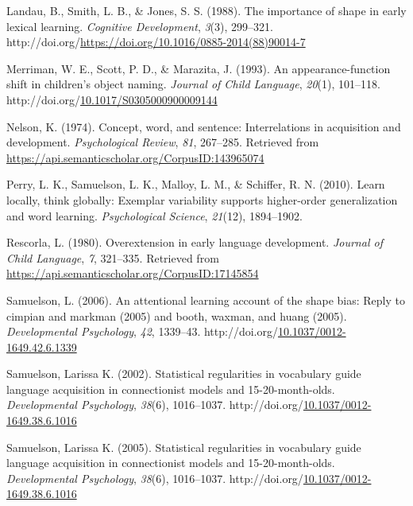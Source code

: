 \documentclass[10pt, letterpaper]{article}
\newenvironment{CSLReferences}%
  {}%
  {\par}
\begin{document}
\begin{CSLReferences}{1}{0}
\leavevmode{}%
Landau, B., Smith, L. B., \& Jones, S. S. (1988). The importance of
shape in early lexical learning. \emph{Cognitive Development},
\emph{3}(3), 299--321.
http://doi.org/\url{https://doi.org/10.1016/0885-2014(88)90014-7}

\leavevmode{}%
Merriman, W. E., Scott, P. D., \& Marazita, J. (1993). An
appearance-function shift in children's object naming. \emph{Journal of
Child Language}, \emph{20}(1), 101--118.
http://doi.org/\href{https://doi.org/10.1017/S0305000900009144}{10.1017/S0305000900009144}

\leavevmode{}%
Nelson, K. (1974). Concept, word, and sentence: Interrelations in
acquisition and development. \emph{Psychological Review}, \emph{81},
267--285. Retrieved from
\url{https://api.semanticscholar.org/CorpusID:143965074}

\leavevmode{}%
Perry, L. K., Samuelson, L. K., Malloy, L. M., \& Schiffer, R. N.
(2010). Learn locally, think globally: Exemplar variability supports
higher-order generalization and word learning. \emph{Psychological
Science}, \emph{21}(12), 1894--1902.

\leavevmode{}%
Rescorla, L. (1980). Overextension in early language development.
\emph{Journal of Child Language}, \emph{7}, 321--335. Retrieved from
\url{https://api.semanticscholar.org/CorpusID:17145854}

\leavevmode{}%
Samuelson, L. (2006). An attentional learning account of the shape bias:
Reply to cimpian and markman (2005) and booth, waxman, and huang (2005).
\emph{Developmental Psychology}, \emph{42}, 1339--43.
http://doi.org/\href{https://doi.org/10.1037/0012-1649.42.6.1339}{10.1037/0012-1649.42.6.1339}

\leavevmode{}%
Samuelson, Larissa K. (2002). Statistical regularities in vocabulary
guide language acquisition in connectionist models and 15-20-month-olds.
\emph{Developmental Psychology}, \emph{38}(6), 1016--1037.
http://doi.org/\href{https://doi.org/10.1037/0012-1649.38.6.1016}{10.1037/0012-1649.38.6.1016}

\leavevmode{}%
Samuelson, Larissa K. (2005). Statistical regularities in vocabulary
guide language acquisition in connectionist models and 15-20-month-olds.
\emph{Developmental Psychology}, \emph{38}(6), 1016--1037.
http://doi.org/\href{https://doi.org/10.1037/0012-1649.38.6.1016}{10.1037/0012-1649.38.6.1016}


\end{CSLReferences}
\end{document}
